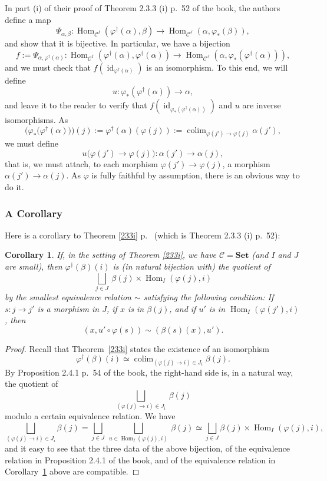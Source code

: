 \documentclass[12pt]{article}%
\newtheorem{cor}[thm]{Corollary}
\theoremstyle{remark}
\theoremstyle{definition}
\newcommand{\C}{\mathcal C}
\newcommand{\Set}{\mathbf{Set}}%
\newcommand{\pp}{\varphi}
\DeclareMathOperator*{\colim}{colim}%
\DeclareMathOperator{\id}{id}
\DeclareMathOperator{\Hom}{Hom}%
\begin{document}
In part (i) of their proof of Theorem 2.3.3 (i) p.~52 of the book, the authors define a map 
%
\begin{equation}\label{e233i} 
%
\Psi_{\alpha,\beta}:
\Hom_{\C^I}(\pp^\dagger(\alpha),\beta)\to
\Hom_{\C^J}(\alpha,\pp_*(\beta)),
%
\end{equation} 
%
and show that it is bijective. In particular, we have a bijection 
$$
f:=\Psi_{\alpha,\pp^\dagger(\alpha)}:
\Hom_{\C^I}(\pp^\dagger(\alpha),\pp^\dagger(\alpha))\to
\Hom_{\C^J}(\alpha,\pp_*(\pp^\dagger(\alpha))),
$$
and we must check that $f(\id_{\pp^\dagger(\alpha)})$ is an isomorphism. To this end, we will define 
$$
u:\pp_*(\pp^\dagger(\alpha))\to\alpha,
$$
and leave it to the reader to verify that $f(\id_{\pp_*(\pp^\dagger(\alpha))})$ and $u$ are inverse isomorphisms. As 
$$ 
\Big(\pp_*\big(\pp^\dagger(\alpha)\big)\Big)(j):=\pp^\dagger(\alpha)(\pp(j)):=\colim_{\pp(j')\to\pp(j)}\alpha(j'),
$$
we must define 
$$
u\big(\pp(j')\to\pp(j)\big):\alpha(j')\to\alpha(j),
$$
that is, we must attach, to each morphism $\pp(j')\to\pp(j)$, a morphism $\alpha(j')\to\alpha(j)$. As $\pp$ is fully faithful by assumption, there is an obvious way to do it.


\subsubsection{A Corollary}

Here is a corollary to Theorem \ref{233i} p.~\pageref{233i} (which is Theorem 2.3.3 (i) p.~52):

\begin{cor}\label{c233i}
If, in the setting of Theorem \ref{233i}, we have $\C=\Set$ (and $I$ and $J$ are small), then $\pp^\dagger(\beta)(i)$ is (in natural bijection with) the quotient of 
$$
\bigsqcup_{j\in J}\ \beta(j)\times\Hom_I(\pp(j),i) 
$$ 
by the smallest equivalence relation $\sim$ satisfying the following condition: If $s:j\to j'$ is a morphism in $J$, if $x$ is in $\beta(j)$, and if $u'$ is in $\Hom_I(\pp(j'),i)$, then 
$$
(x,u'\circ\pp(s))\sim(\beta(s)(x),u'). 
$$
\end{cor}

\begin{proof}
Recall that Theorem~\ref{233i} states the existence of an isomorphism 
$$
\pp^\dagger(\beta)(i)\simeq\colim_{(\pp(j)\to i)\in J_i}\beta(j).
$$
By Proposition 2.4.1 p.~54 of the book, the right-hand side is, in a natural way, the quotient of 
$$
\bigsqcup_{(\pp(j)\to i)\in J_i}\ \beta(j)
$$ 
modulo a certain equivalence relation. We have 
$$
\bigsqcup_{(\pp(j)\to i)\in J_i}\beta(j)=\bigsqcup_{j\in J}\ \bigsqcup_{u\in\Hom_I(\pp(j),i)}\ \beta(j)\simeq\bigsqcup_{j\in J}\beta(j)\times\Hom_I(\pp(j),i),
$$ 
and it easy to see that the three data of the above bijection, of the equivalence relation in Proposition 2.4.1 of the book, and of the equivalence relation in Corollary~\ref{c233i} above are compatible.
\end{proof}
\end{document}
